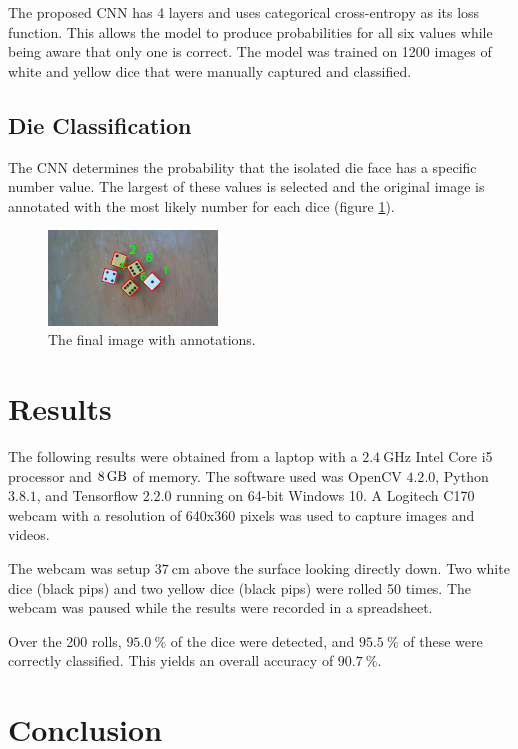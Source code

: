 \documentclass[conference]{IEEEtran}
\begin{document}
The proposed CNN has 4 layers and uses categorical cross-entropy as its loss function. 
This allows the model to produce probabilities for all six values while being aware that only one is correct.
The model was trained on 1200 images of white and yellow dice that were manually captured and classified.

\subsection{Die Classification}

The CNN determines the probability that the isolated die face has a specific number value.
The largest of these values is selected and the original image is annotated with the most likely number for each dice (figure \ref{fig:annotated}).
\begin{figure}
	\centering
	\includegraphics[width=0.4\textwidth]{annotated}
	\caption{The final image with annotations.}
	\label{fig:annotated}
\end{figure}

\section{Results}

The following results were obtained from a laptop with a $\SI{2.4}{\giga\hertz}$ Intel Core i5 processor and $\SI{8}{\giga\byte}$ of memory.
The software used was OpenCV $4.2.0$, Python $3.8.1$, and Tensorflow $2.2.0$ running on 64-bit Windows 10.
A Logitech C170 webcam with a resolution of 640x360 pixels was used to capture images and videos.

The webcam was setup $\SI{37}{\centi\metre}$ above the surface looking directly down. 
Two white dice (black pips) and two yellow dice (black pips) were rolled 50 times.
The webcam was paused while the results were recorded in a spreadsheet.

Over the 200 rolls, $\SI{95.0}{\percent}$ of the dice were detected, and $\SI{95.5}{\percent}$ of these were correctly classified.
This yields an overall accuracy of $\SI{90.7}{\percent}$.

\section{Conclusion}
\end{document}
